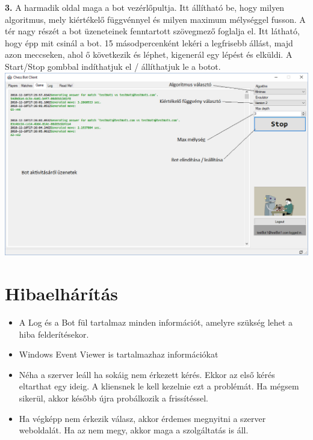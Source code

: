 \documentclass[twoside, a4paper, 12pt]{book}
\begin{document}
\noindent \textbf{3.} A harmadik oldal maga a bot vezérlőpultja. Itt állítható be, hogy milyen algoritmus, mely kiértékelő függvénnyel és milyen maximum mélységgel fusson. A tér nagy részét a bot üzeneteinek fenntartott szövegmező foglalja el. Itt látható, hogy épp mit csinál a bot. 15 másodpercenként lekéri a legfrisebb állást, majd azon meccseken, ahol ő következik és léphet, kigenerál egy lépést és elküldi. A Start/Stop gombbal indíthatjuk el / állíthatjuk le a botot. \\
\includegraphics[width=1.0\textwidth]{img/botClient_3.png} \\

\section{Hibaelhárítás}
\begin{itemize}
	\item A Log és a Bot fül tartalmaz minden információt, amelyre szükség lehet a hiba felderítésekor.
	\item Windows Event Viewer is tartalmazhaz információkat
	\item Néha a szerver leáll ha sokáig nem érkezett kérés. Ekkor az első kérés eltarthat egy ideig. A kliensnek le kell kezelnie ezt a problémát. Ha mégsem sikerül, akkor később újra probálkozik a frissítéssel.
	\item Ha végképp nem érkezik válasz, akkor érdemes megnyitni a szerver weboldalát. Ha az nem megy, akkor maga a szolgáltatás is áll.
\end{itemize}

\newpage
\end{document}
